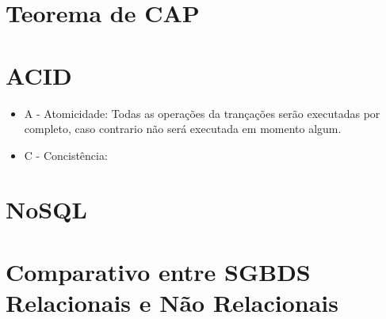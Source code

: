 \section{Teorema de CAP}

\section{ACID}
  \begin{itemize}
    \item{ A - Atomicidade:
      Todas as operações da trançações serão executadas por completo, caso contrario não será executada em momento algum.
    }
    
    \item{ C - Concistência:
      
    }
  \end{itemize}

\section{NoSQL}

\section{Comparativo entre SGBDS Relacionais e Não Relacionais}
